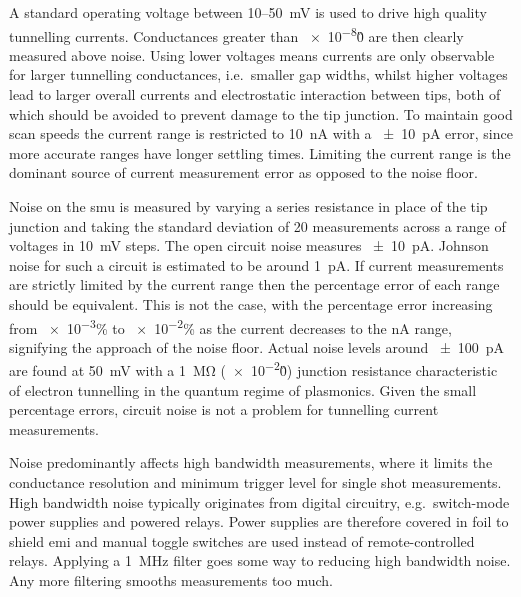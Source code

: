 \documentclass{article}
\begin{document}
A standard operating voltage between 10--\SI{50}{mV} is used to drive high quality tunnelling currents. Conductances greater than \num{e-8}\G0 are then clearly measured above noise. Using lower voltages means currents are only observable for larger tunnelling conductances, i.e.\ smaller gap widths, whilst higher voltages lead to larger overall currents and electrostatic interaction between tips, both of which should be avoided to prevent damage to the tip junction. To maintain good scan speeds the current range is restricted to \SI{10}{nA} with a \SI{\pm10}{pA} error, since more accurate ranges have longer settling times. Limiting the current range is the dominant source of current measurement error as opposed to the noise floor.


Noise on the \gls{smu} is measured by varying a series resistance in place of the tip junction and taking the standard deviation of 20 measurements across a range of voltages in \SI{10}{mV} steps. The open circuit noise measures \SI{\pm10}{pA}. Johnson noise for such a circuit is estimated to be around \SI{1}{pA}.
If current measurements are strictly limited by the current range then the percentage error of each range should be equivalent. This is not the case, with the percentage error increasing from \num{e-3}\% to \num{e-2}\% as the current decreases to the nA range, signifying the approach of the noise floor. Actual noise levels around \SI{\pm100}{pA} are found at \SI{50}{mV} with a \SI{1}{\mega\ohm} (\num{e-2}\G0) junction resistance characteristic of electron tunnelling in the quantum regime of plasmonics. Given the small percentage errors, circuit noise is not a problem for tunnelling current measurements.

Noise predominantly affects high bandwidth measurements, where it limits the conductance resolution and minimum trigger level for single shot measurements. High bandwidth noise typically originates from digital circuitry, e.g.\ switch-mode power supplies and powered relays. Power supplies are therefore covered in foil to shield \gls{emi} and manual toggle switches are used instead of remote-controlled relays. Applying a \SI{1}{MHz} filter goes some way to reducing high bandwidth noise. Any more filtering smooths measurements too much.
\end{document}
